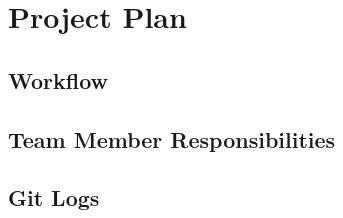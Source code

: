 \chapter{Project Plan}

\section{Workflow}

\section{Team Member Responsibilities}

\section{Git Logs}
